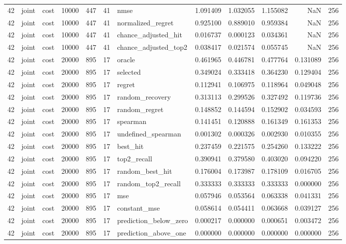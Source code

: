 \begin{tabular}{rllrrrlrrrrr}
42 & joint & cost & 10000 & 447 & 41 & nmse & 1.091409 & 1.032055 & 1.155082 & NaN & 256 \\
42 & joint & cost & 10000 & 447 & 41 & normalized_regret & 0.925100 & 0.889010 & 0.959384 & NaN & 256 \\
42 & joint & cost & 10000 & 447 & 41 & chance_adjusted_hit & 0.016737 & 0.000123 & 0.034361 & NaN & 256 \\
42 & joint & cost & 10000 & 447 & 41 & chance_adjusted_top2 & 0.038417 & 0.021574 & 0.055745 & NaN & 256 \\
42 & joint & cost & 20000 & 895 & 17 & oracle & 0.461965 & 0.446781 & 0.477764 & 0.131089 & 256 \\
42 & joint & cost & 20000 & 895 & 17 & selected & 0.349024 & 0.333418 & 0.364230 & 0.129404 & 256 \\
42 & joint & cost & 20000 & 895 & 17 & regret & 0.112941 & 0.106975 & 0.118964 & 0.049048 & 256 \\
42 & joint & cost & 20000 & 895 & 17 & random_recovery & 0.313113 & 0.299526 & 0.327492 & 0.119736 & 256 \\
42 & joint & cost & 20000 & 895 & 17 & random_regret & 0.148852 & 0.144594 & 0.152902 & 0.034593 & 256 \\
42 & joint & cost & 20000 & 895 & 17 & spearman & 0.141451 & 0.120888 & 0.161349 & 0.161353 & 256 \\
42 & joint & cost & 20000 & 895 & 17 & undefined_spearman & 0.001302 & 0.000326 & 0.002930 & 0.010355 & 256 \\
42 & joint & cost & 20000 & 895 & 17 & best_hit & 0.237459 & 0.221575 & 0.254260 & 0.133222 & 256 \\
42 & joint & cost & 20000 & 895 & 17 & top2_recall & 0.390941 & 0.379580 & 0.403020 & 0.094220 & 256 \\
42 & joint & cost & 20000 & 895 & 17 & random_best_hit & 0.176004 & 0.173987 & 0.178109 & 0.016705 & 256 \\
42 & joint & cost & 20000 & 895 & 17 & random_top2_recall & 0.333333 & 0.333333 & 0.333333 & 0.000000 & 256 \\
42 & joint & cost & 20000 & 895 & 17 & mse & 0.057946 & 0.053564 & 0.063338 & 0.041331 & 256 \\
42 & joint & cost & 20000 & 895 & 17 & constant_mse & 0.058614 & 0.054411 & 0.063668 & 0.039127 & 256 \\
42 & joint & cost & 20000 & 895 & 17 & prediction_below_zero & 0.000217 & 0.000000 & 0.000651 & 0.003472 & 256 \\
42 & joint & cost & 20000 & 895 & 17 & prediction_above_one & 0.000000 & 0.000000 & 0.000000 & 0.000000 & 256 \\

\end{tabular}
